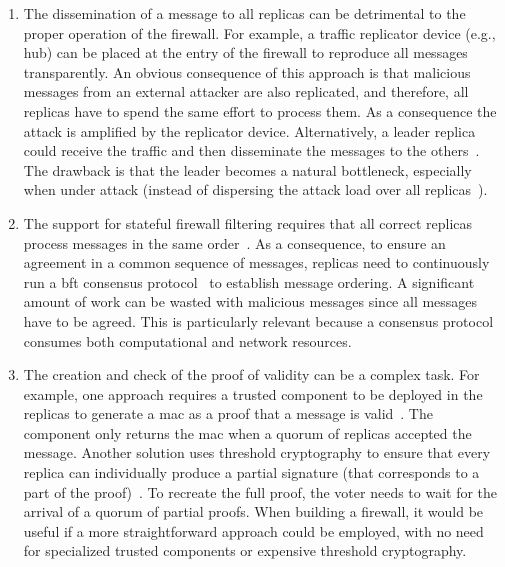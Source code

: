 \begin{enumerate}

\item The dissemination of a message to all replicas can be detrimental to the proper operation of the firewall. 
For example, a traffic replicator device (e.g., hub) can be placed at the entry of the firewall to reproduce all messages~\cite{Sousa:2010,Roeder:2010} transparently. 
An obvious consequence of this approach is that malicious messages from an external attacker are also replicated, and therefore, all replicas have to spend the same effort to process them.
As a consequence the attack is amplified by the replicator device.
Alternatively, a leader replica could receive the traffic and then disseminate the messages to the others~\cite{Roeder:2010}.
The drawback is that the leader becomes a natural bottleneck, especially when under attack (instead of dispersing the attack load over all replicas~\cite{Amir:2011}).

\item The support for stateful firewall filtering requires that all correct replicas process messages in the same order~\cite{Schneider:1990}.
As a consequence, to ensure an agreement in a common sequence of messages, replicas need to continuously run a \gls{bft} consensus protocol~\cite{Castro:2002} to establish message ordering.
A significant amount of work can be wasted with malicious messages since all messages have to be agreed. This is particularly relevant because a consensus protocol consumes both computational and network resources.

\item The creation and check of the proof of validity can be a complex task. For example, one approach requires a trusted component to be deployed in the replicas to generate a \gls{mac} as a proof that a message is valid~\cite{Sousa:2010}. 
The component only returns the \gls{mac} when a quorum of replicas accepted the message. 
Another solution uses threshold cryptography to ensure that every replica can individually produce a partial signature (that corresponds to a part of the proof)~\cite{Roeder:2010}. 
To recreate the full proof, the voter needs to wait for the arrival of a quorum of partial proofs. 
When building a firewall, it would be useful if a more straightforward approach could be employed, with no need for specialized trusted components or expensive threshold cryptography.

\end{enumerate}

